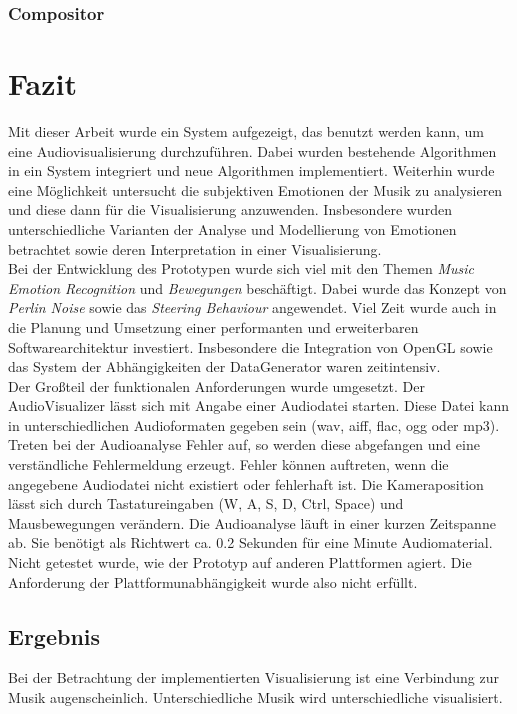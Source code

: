 \documentclass[11pt,a4paper]{article}
\begin{document}
\subsubsection{Compositor}

\newpage

\section{Fazit}
Mit dieser Arbeit wurde ein System aufgezeigt, das benutzt werden kann, um eine Audiovisualisierung durchzuführen. Dabei wurden bestehende Algorithmen in ein System integriert und neue Algorithmen implementiert. Weiterhin wurde eine Möglichkeit untersucht die subjektiven Emotionen der Musik zu analysieren und diese dann für die Visualisierung anzuwenden. Insbesondere wurden unterschiedliche Varianten der Analyse und Modellierung von Emotionen betrachtet sowie deren Interpretation in einer Visualisierung.\\
Bei der Entwicklung des Prototypen wurde sich viel mit den Themen \textit{Music Emotion Recognition} und \textit{Bewegungen} beschäftigt. Dabei wurde das Konzept von \textit{Perlin Noise} sowie das \textit{Steering Behaviour} angewendet. Viel Zeit wurde auch in die Planung und Umsetzung einer performanten und erweiterbaren Softwarearchitektur investiert. Insbesondere die Integration von OpenGL sowie das System der Abhängigkeiten der DataGenerator waren zeitintensiv.\\
Der Großteil der funktionalen Anforderungen wurde umgesetzt. Der AudioVisualizer lässt sich mit Angabe einer Audiodatei starten. Diese Datei kann in unterschiedlichen Audioformaten gegeben sein (wav, aiff, flac, ogg oder mp3). Treten bei der Audioanalyse Fehler auf, so werden diese abgefangen und eine verständliche Fehlermeldung erzeugt. Fehler können auftreten, wenn die angegebene Audiodatei nicht existiert oder fehlerhaft ist. Die Kameraposition lässt sich durch Tastatureingaben (W, A, S, D, Ctrl, Space) und Mausbewegungen verändern. Die Audioanalyse läuft in einer kurzen Zeitspanne ab. Sie benötigt als Richtwert ca. 0.2 Sekunden für eine Minute Audiomaterial. Nicht getestet wurde, wie der Prototyp auf anderen Plattformen agiert. Die Anforderung der Plattformunabhängigkeit wurde also nicht erfüllt.

\subsection{Ergebnis}
Bei der Betrachtung der implementierten Visualisierung ist eine Verbindung zur Musik augenscheinlich. Unterschiedliche Musik wird unterschiedliche visualisiert.\\
% 
\end{document}
